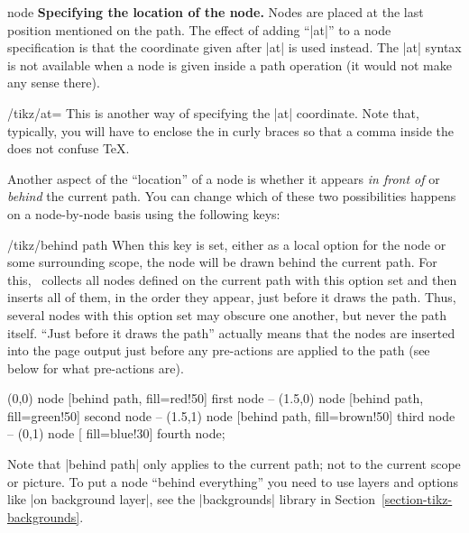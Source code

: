 \begin{pathoperation}{node}
    \medskip
    \textbf{Specifying the location of the node.}
    Nodes are placed at the last position mentioned on the path. The effect of
    adding ``|at|'' to a node specification is that the coordinate given after
    |at| is used instead. The |at| syntax is not available when a node is given
    inside a path operation (it would not make any sense there).

    \begin{key}{/tikz/at=}
        This is another way of specifying the |at| coordinate. Note that,
        typically, you will have to enclose the  in curly
        braces so that a comma inside the  does not confuse
        \TeX.
    \end{key}

    Another aspect of the ``location'' of a node is whether it appears \emph{in
    front of} or \emph{behind} the current path. You can change which of these
    two possibilities happens on a node-by-node basis using the following keys:
    \begin{key}{/tikz/behind path}
        When this key is set, either as a local option for the node or some
        surrounding scope, the node will be drawn behind the current path. For
        this, \tikzname\ collects all nodes defined on the current path with
        this option set and then inserts all of them, in the order they appear,
        just before it draws the path. Thus, several nodes with this option set
        may obscure one another, but never the path itself. ``Just before it
        draws the path'' actually means that the nodes are inserted into the
        page output just before any pre-actions are applied to the path (see
        below for what pre-actions are).
\begin{codeexample}[]
\tikz \fill [fill=blue!50, draw=blue, very thick]
      (0,0)   node [behind path, fill=red!50]   {first node}
   -- (1.5,0) node [behind path, fill=green!50] {second node}
   -- (1.5,1) node [behind path, fill=brown!50] {third node}
   -- (0,1)   node [             fill=blue!30]  {fourth node};
\end{codeexample}

        Note that |behind path| only applies to the current path; not to the
        current scope or picture. To put a node ``behind everything'' you need
        to use layers and options like |on background layer|, see the
        |backgrounds| library in Section~\ref{section-tikz-backgrounds}.
    \end{key}


\end{pathoperation}
